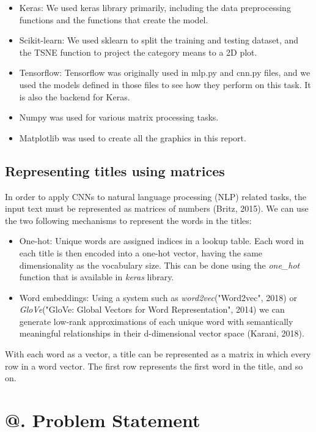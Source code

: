 \documentclass[jou,apacite, 10px]{apa6}
\makeatletter
\newcommand*{\rom}[1]{\expandafter\@slowromancap\romannumeral #1@}
\makeatother
\begin{document}
\begin{itemize}
\item Keras: We used keras library primarily, including the data preprocessing functions and the functions that create the model.
\item Scikit-learn: We used sklearn to split the training and testing dataset, and the TSNE function to project the category means to a 2D plot.
\item Tensorflow: Tensorflow was originally used in mlp.py and cnn.py files, and we used the models defined in those files to see how they perform on this task. It is also the backend for Keras.
\item Numpy was used for various matrix processing tasks.
\item Matplotlib was used to create all the graphics in this report.
\end{itemize}

\subsection{Representing titles using matrices}
In order to apply CNNs to natural language processing (NLP) related tasks, the input text must be represented as matrices of numbers (Britz, 2015). We can use the two following mechanisms to represent the words in the titles:
\begin{itemize}
\item One-hot: Unique words are assigned indices in a lookup table. Each word in each title is then encoded into a one-hot vector, having the same dimensionality as the vocabulary size. This can be done using the \textit{one\_hot} function that is available in \textit{keras} library.
\item Word embeddings: Using a system such as \textit{word2vec}("Word2vec", 2018) or \textit{GloVe}("GloVe: Global Vectors for Word Representation", 2014) we can generate low-rank approximations of each unique word with semantically meaningful relationships in their d-dimensional vector space (Karani, 2018).
\end{itemize}
With each word as a vector, a title can be represented as a matrix in which every row in a word vector. The first row represents the first word in the title, and so on.

\section{\rom{3}. Problem Statement}
\end{document}
